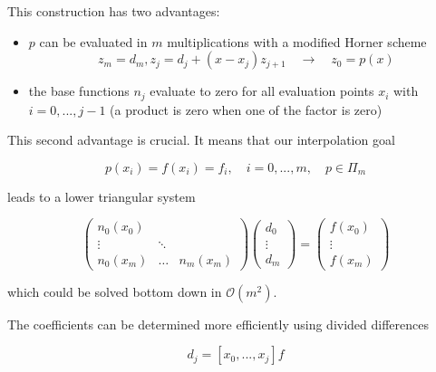This construction has two advantages:

\begin{itemize}
    \item $p$ can be evaluated in $m$ multiplications with a modified Horner scheme
    \begin{equation}
        z_m = d_m, z_j = d_j + (x - x_j) z_{j+1} \quad \rightarrow \quad z_0 = p(x)
    \end{equation}
    \item the base functions $n_j$ evaluate to zero for all evaluation points $x_i$ with $i = 0, ..., j-1$ (a product is zero when one of the factor is zero)
\end{itemize}

This second advantage is crucial. It means that our interpolation goal

\begin{equation}
    p(x_i) = f(x_i) = f_i, \quad i = 0,...,m, \quad p \in \Pi_m
\end{equation}

leads to a lower triangular system

\begin{equation}
    \left(\begin{array}{ccc}
    n_0\left(x_0\right) & & \\
    \vdots & \ddots & \\
    n_0\left(x_m\right) & \ldots & n_m\left(x_m\right)
    \end{array}\right)\left(\begin{array}{c}
    d_0 \\
    \vdots \\
    d_m
    \end{array}\right)=\left(\begin{array}{c}
    f\left(x_0\right) \\
    \vdots \\
    f\left(x_m\right)
    \end{array}\right)
\end{equation}

which could be solved bottom down in $\mathcal{O}(m^2)$.


The coefficients can be determined more 
efficiently using divided differences

\begin{equation}
    d_j = [x_0,...,x_j] f
\end{equation}


